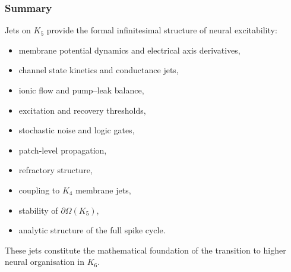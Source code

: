 \subsubsection{Summary}

Jets on $K_5$ provide the formal infinitesimal structure of neural
excitability:

\begin{itemize}
    \item membrane potential dynamics and electrical axis derivatives,
    \item channel state kinetics and conductance jets,
    \item ionic flow and pump–leak balance,
    \item excitation and recovery thresholds,
    \item stochastic noise and logic gates,
    \item patch-level propagation,
    \item refractory structure,
    \item coupling to $K_4$ membrane jets,
    \item stability of $\partial\Omega(K_5)$,
    \item analytic structure of the full spike cycle.
\end{itemize}

These jets constitute the mathematical foundation of the transition to
higher neural organisation in $K_6$.
